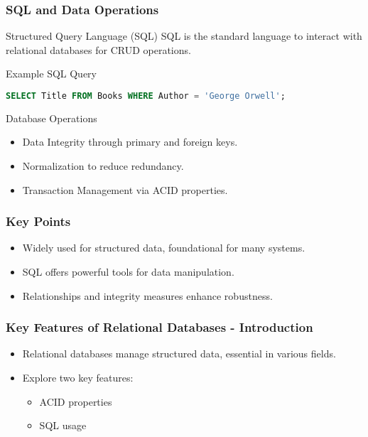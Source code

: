 \documentclass[aspectratio=169]{beamer}
\begin{document}
\begin{frame}[fragile]
    \frametitle{SQL and Data Operations}
    \begin{block}{Structured Query Language (SQL)}
        SQL is the standard language to interact with relational databases for CRUD operations.
    \end{block}

    \begin{block}{Example SQL Query}
        \begin{lstlisting}[language=SQL]
SELECT Title FROM Books WHERE Author = 'George Orwell';
        \end{lstlisting}
    \end{block}
    
    \begin{block}{Database Operations}
        \begin{itemize}
            \item Data Integrity through primary and foreign keys.
            \item Normalization to reduce redundancy.
            \item Transaction Management via ACID properties.
        \end{itemize}
    \end{block}
\end{frame}

\begin{frame}
    \frametitle{Key Points}
    \begin{itemize}
        \item Widely used for structured data, foundational for many systems.
        \item SQL offers powerful tools for data manipulation.
        \item Relationships and integrity measures enhance robustness.
    \end{itemize}
\end{frame}

\begin{frame}[fragile]
    \frametitle{Key Features of Relational Databases - Introduction}
    \begin{itemize}
        \item Relational databases manage structured data, essential in various fields.
        \item Explore two key features:
        \begin{itemize}
            \item ACID properties
            \item SQL usage
        \end{itemize}
    \end{itemize}
\end{frame}
\end{document}
